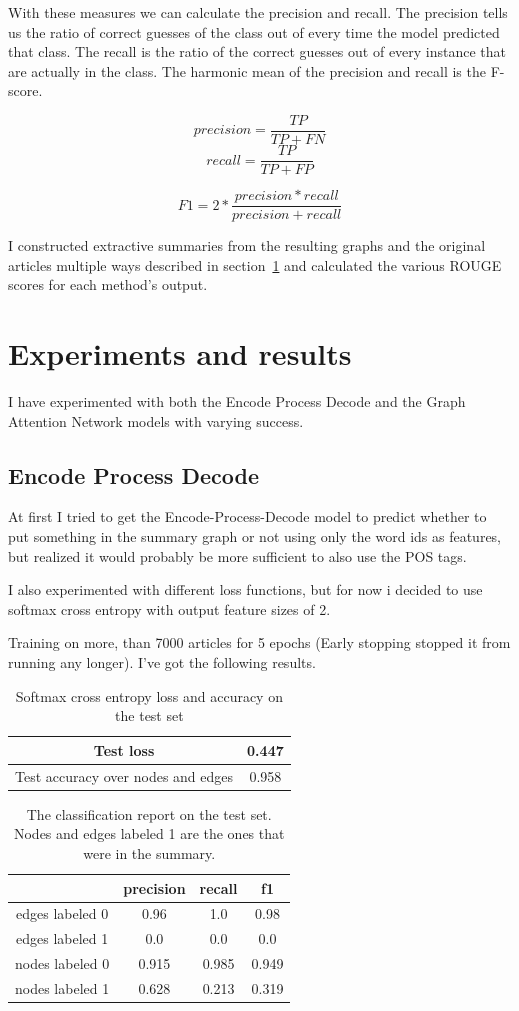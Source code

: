 With these measures we can calculate the precision and recall. The precision tells us the ratio of correct guesses of the class out of every time the model predicted that class. The recall is the ratio of the correct guesses out of every instance that are actually in the class. The harmonic mean of the precision and recall is the F-score.

\[precision = \frac{TP}{TP + FN}\]
\[recall = \frac{TP}{TP + FP}\]

\[F1 = 2 * \frac{precision * recall}{precision + recall}\]

I constructed extractive summaries from the resulting graphs and the original articles multiple ways described in section~\ref{ssect:ExperimnetsAndResults} and calculated the various ROUGE scores for each method's output.

\section{Experiments and results}\label{ssect:ExperimnetsAndResults}
I have experimented with both the Encode Process Decode and the Graph Attention Network models with varying success.
\subsection{Encode Process Decode}
At first I tried to get the Encode-Process-Decode model to predict whether to put something in the summary graph or not using only the word ids as features, but realized it would probably be more sufficient to also use the POS tags.

I also experimented with different loss functions, but for now i decided to use softmax cross entropy with output feature sizes of 2.

Training on more, than 7000 articles for 5 epochs (Early stopping stopped it from running any longer). I've got the following results.
\begin{table}[!h]
	\centering
	\begin{tabular}{| c | c |}
		\hline
		Test loss & 0.447 \\ \hline
		Test accuracy over nodes and edges & 0.958 \\ \hline
	\end{tabular}
	\caption{Softmax cross entropy loss and accuracy on the test set}
\end{table}

\begin{table}[!h]
	\centering
	\begin{tabular}{| c | c | c | c |}
		\hline
		 & precision & recall & f1 \\ \hline \hline
		edges labeled 0&0.96&1.0&0.98  \\ \hline
		edges labeled 1 & 0.0 & 0.0 & 0.0 \\ \hline
		nodes labeled 0 & 0.915 & 0.985 & 0.949 \\ \hline
		nodes labeled 1 & 0.628 & 0.213 & 0.319 \\ \hline
	\end{tabular}
	\caption{The classification report on the test set. Nodes and edges labeled 1 are the ones that were in the summary.}
\end{table}

